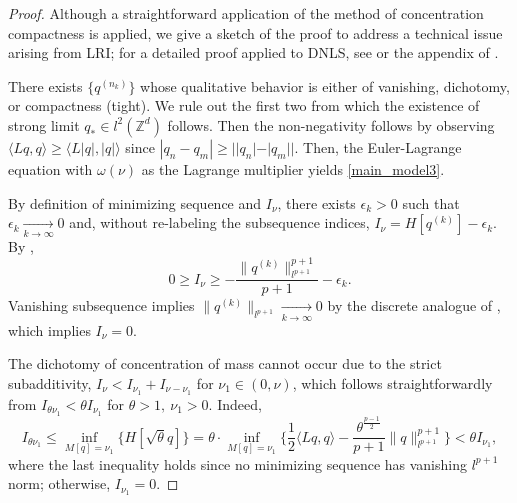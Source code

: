 \documentclass{article}
\numberwithin{equation}{section}
\begin{document}
\begin{proof}
    Although a straightforward application of the method of concentration compactness is applied, we give a sketch of the proof to address a technical issue arising from LRI; for a detailed proof applied to DNLS, see \cite{Lions1984II} or the appendix of \cite{weinstein1999excitation}.
    
    There exists $\{q^{(n_k)}\}$ whose qualitative behavior is either of vanishing, dichotomy, or compactness (tight). We rule out the first two from which the existence of strong limit $q_* \in l^2(\mathbb{Z}^d)$ follows. Then the non-negativity follows by observing $\langle Lq,q \rangle \geq \langle L|q|,|q| \rangle$ since $|q_n - q_m| \geq ||q_n| - |q_m||$. Then, the Euler-Lagrange equation with $\omega(\nu)$ as the Lagrange multiplier yields \eqref{main_model3}.    

    By definition of minimizing sequence and $I_\nu$, there exists $\epsilon_k > 0$ such that $\epsilon_k \xrightarrow[k \rightarrow \infty]{} 0$ and, without re-labeling the subsequence indices, $I_\nu = H[q^{(k)}] - \epsilon_k$. By ,
    \begin{equation*}
        0 \geq I_\nu \geq -\frac{\| q^{(k)} \|_{l^{p+1}}^{p+1}}{p+1} - \epsilon_k. 
    \end{equation*}
    Vanishing subsequence implies $\| q^{(k)} \|_{l^{p+1}} \xrightarrow[k \rightarrow \infty]{} 0$ by the discrete analogue of \cite[Lemma I.1]{Lions1984II}, which implies $I_\nu = 0$.

    The dichotomy of concentration of mass cannot occur due to the strict subadditivity, $I_\nu < I_{\nu_1} + I_{\nu - \nu_1}$ for $\nu_1 \in (0,\nu)$, which follows straightforwardly from $I_{\theta \nu_1} < \theta I_{\nu_1}$ for $\theta > 1,\ \nu_1 > 0$. Indeed,    \begin{equation*}
        I_{\theta \nu_1} \leq \inf_{M[q] = \nu_1} \{H[\sqrt{\theta}q]\} = \theta \cdot \inf_{M[q] = \nu_1} \{\frac{1}{2}\langle Lq,q \rangle - \frac{\theta^{\frac{p-1}{2}}}{p+1}\| q \|_{l^{p+1}}^{p+1}\} < \theta I_{\nu_1},
    \end{equation*}
where the last inequality holds since no minimizing sequence has vanishing $l^{p+1}$ norm; otherwise, $I_{\nu_1} = 0$.


\end{proof}
\end{document}
